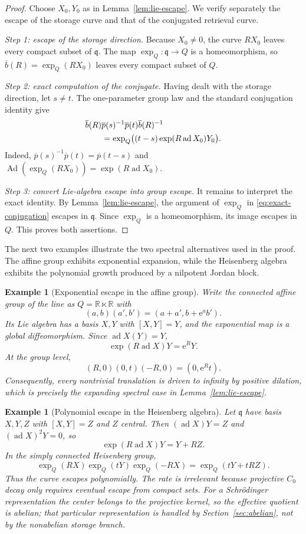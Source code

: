 \documentclass[10pt,a4paper]{amsart}
\numberwithin{equation}{section}
\newtheorem{example}[theorem]{Example}
\newcommand{\R}{\mathbb R}
\newcommand{\Ad}{\operatorname{Ad}}
\newcommand{\ad}{\operatorname{ad}}
\newcommand{\e}{\mathrm e}
\newcommand{\Step}[1]{\par\medskip\noindent\textit{#1.}\quad}
\begin{document}
\begin{proof}
Choose $X_0,Y_0$ as in Lemma~\ref{lem:lie-escape}.  We verify separately the
escape of the storage curve and that of the conjugated retrieval curve.

\Step{Step 1: escape of the storage direction}
Because $X_0\neq0$, the curve $RX_0$ leaves every compact subset of
$\mathfrak q$.  The map $\exp_Q:\mathfrak q\to Q$ is a homeomorphism, so
$\overline b(R)=\exp_Q(RX_0)$ leaves every compact subset of $Q$.

\Step{Step 2: exact computation of the conjugate}
Having dealt with the storage direction, let $s\neq t$.  The one-parameter
group law and the standard conjugation
identity give
\begin{align}\label{eq:exact-conjugation}
 &\overline b(R)\overline p(s)^{-1}\overline p(t)
   \overline b(R)^{-1}\notag\\
 &\qquad
 =\exp_Q\bigl((t-s)\exp(R\ad X_0)Y_0\bigr).
\end{align}
Indeed, $\overline p(s)^{-1}\overline p(t)=\overline p(t-s)$ and
$\Ad(\exp_Q(RX_0))=\exp(R\ad X_0)$.

\Step{Step 3: convert Lie-algebra escape into group escape}
It remains to interpret the exact identity.  By
Lemma~\ref{lem:lie-escape}, the argument of $\exp_Q$ in
\eqref{eq:exact-conjugation} escapes in $\mathfrak q$.  Since $\exp_Q$ is a
homeomorphism, its image escapes in $Q$.  This proves both assertions.
\end{proof}

The next two examples illustrate the two spectral alternatives used in the
proof.  The affine group exhibits exponential expansion, while the
Heisenberg algebra exhibits the polynomial growth produced by a nilpotent
Jordan block.

\begin{example}[Exponential escape in the affine group]
\label{ex:affine-escape}
Write the connected affine group of the line as $Q=\R\ltimes\R$ with
\[
 (a,b)(a',b')=(a+a',b+\e^a b').
\]
Its Lie algebra has a basis $X,Y$ with $[X,Y]=Y$, and the exponential map is
a global diffeomorphism.  Since $\ad X(Y)=Y$,
\[
 \exp(R\ad X)Y=\e^R Y.
\]
At the group level,
\[
 (R,0)(0,t)(-R,0)=(0,\e^Rt).
\]
Consequently, every nontrivial translation is driven to infinity by positive
dilation, which is precisely the expanding spectral case in
Lemma~\ref{lem:lie-escape}.
\end{example}

\begin{example}[Polynomial escape in the Heisenberg algebra]
\label{ex:nilpotent-escape}
Let $\mathfrak q$ have basis $X,Y,Z$ with $[X,Y]=Z$ and $Z$ central.  Then
$(\ad X)Y=Z$ and $(\ad X)^2Y=0$, so
\[
 \exp(R\ad X)Y=Y+RZ.
\]
In the simply connected Heisenberg group,
\[
 \exp_Q(RX)\exp_Q(tY)\exp_Q(-RX)
 =\exp_Q(tY+tRZ).
\]
Thus the curve escapes polynomially.  The rate is irrelevant because
projective $C_0$
decay only requires eventual escape from compact sets.  For a Schr\"odinger
representation the center belongs to the projective kernel, so the effective
quotient is abelian; that particular representation is handled by
Section~\ref{sec:abelian}, not by the nonabelian storage branch.
\end{example}
\end{document}
